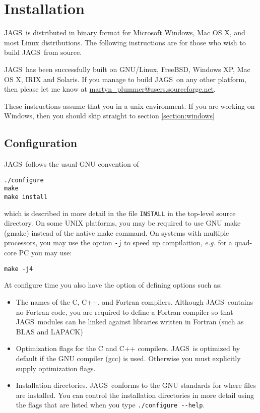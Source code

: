 \documentclass[11pt, a4paper, titlepage]{report}
\newcommand{\JAGS}{\textsf{JAGS}}
\begin{document}



\clearpage

\appendix
\chapter{Installation}

\JAGS\ is distributed in binary format for Microsoft Windows, Mac OS
X, and most Linux distributions.  The following instructions are for
those who wish to build \JAGS\ from source.

\JAGS\ has been successfully built on GNU/Linux, FreeBSD, Windows XP,
Mac OS X, IRIX and Solaris. If you manage to build \JAGS\ on any other
platform, then please let me know at
\url{martyn_plummer@users.sourceforge.net}.

These instructions assume that you in a unix environment. If you
are working on Windows, then you should skip straight to section
\ref{section:windows}

\section{Configuration}

\JAGS\ follows the usual GNU convention of 
\begin{verbatim}
./configure
make
make install
\end{verbatim}
which is described in more detail in the file \texttt{INSTALL} in
the top-level source directory. On some UNIX platforms, you may
be required to use GNU make (gmake) instead of the native make
command. On systems with multiple processors, you may use the option 
\verb+-j+ to speed up compilaition, {\em e.g.} for a quad-core PC you
may use:
\begin{verbatim}
make -j4
\end{verbatim}

At configure time you also have the option of defining options such
as:
\begin{itemize}
\item The names of the C, C++, and Fortran compilers.  Although
  \JAGS\ contains no Fortran code, you are required to define a
  Fortran compiler so that \JAGS\ modules can be linked against
  libraries written in Fortran (such as BLAS and LAPACK)
\item Optimization flags for the C and C++ compilers.  \JAGS\ is
  optimized by default if the GNU compiler (gcc) is used. Otherwise
  you must explicitly supply optimization flags.
\item Installation directories. \JAGS\ conforms to the GNU standards
  for where files are installed. You can control the installation
  directories in more detail using the flags that are listed when
  you type \verb+./configure --help+.
\end{itemize}
\end{document}

